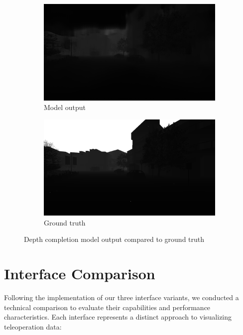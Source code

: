 \begin{figure}[h]
    \centering
    \begin{subfigure}{0.48\textwidth}
        \includegraphics[width=\textwidth]{figures/depth_pred.png}
        \caption{Model output}
        \label{fig:depth_pred}
    \end{subfigure}
    \hfill
    \begin{subfigure}{0.48\textwidth}
        \includegraphics[width=\textwidth]{figures/depth_gt_2.png}
        \caption{Ground truth}
        \label{fig:depth_gt_2}
    \end{subfigure}
    \caption{Depth completion model output compared to ground truth}
    \label{fig:depth_model_comparison}
    \end{figure}


\section{Interface Comparison}

Following the implementation of our three interface variants, we conducted a technical comparison to evaluate their capabilities and performance characteristics. Each interface represents a distinct approach to visualizing teleoperation data:

